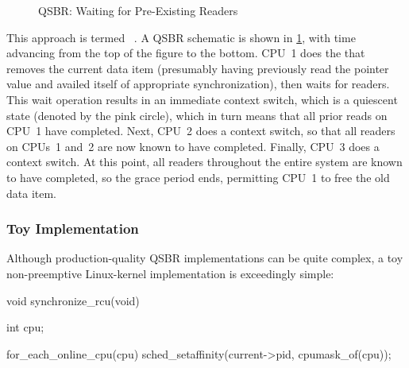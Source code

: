 \begin{figure}
\centering
{}
\caption{QSBR: Waiting for Pre-Existing Readers}
\label{fig:defer:QSBR: Waiting for Pre-Existing Readers}
\end{figure}

This approach is termed ~\cite{ThomasEHart2006a}.
A QSBR schematic is shown in
\cref{fig:defer:QSBR: Waiting for Pre-Existing Readers},
with time advancing from the top of the figure to the bottom.
CPU~1 does the  that removes the current data
item (presumably having previously read the pointer value and
availed itself of appropriate synchronization), then waits
for readers.
This wait operation results in an immediate context switch, which is a
quiescent state (denoted by the pink circle), which in turn means that
all prior reads on CPU~1 have completed.
Next, CPU~2 does a context switch, so that all readers on CPUs~1 and~2
are now known to have completed.
Finally, CPU~3 does a context switch.
At this point, all readers throughout the entire system are known to
have completed, so the grace period ends, permitting CPU~1 to free
the old data item.

\QuickQuizEnd

\subsubsection{Toy Implementation}
\label{sec:defer:Toy Implementation}

Although production-quality QSBR implementations can be quite complex,
a toy non-preemptive Linux-kernel implementation is exceedingly simple:

\begin{VerbatimN}[samepage=true]
void synchronize_rcu(void)
{
	int cpu;

	for_each_online_cpu(cpu)
		sched_setaffinity(current->pid, cpumask_of(cpu));
}
\end{VerbatimN}


